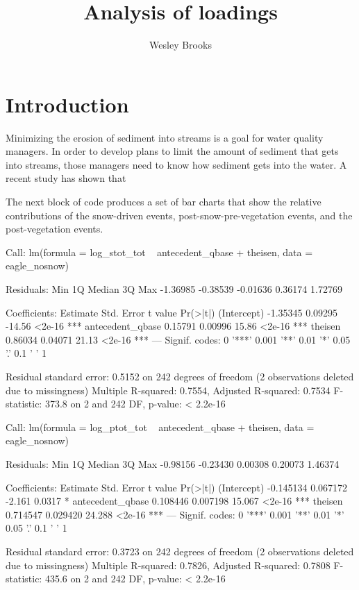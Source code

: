 \documentclass[12pt]{article}
\title{Analysis of loadings}
\author{Wesley Brooks}
\date{}                                           %
\begin{document}
\maketitle


\section{Introduction}
Minimizing the erosion of sediment into streams is a goal for water quality managers. In order to develop plans to limit the amount of sediment that gets into streams, those managers need to know how sediment gets into the water. A recent study \cite{Danz:2010} has shown that 

The next block of code produces a set of bar charts that show the relative contributions of the snow-driven events, post-snow-pre-vegetation events, and the post-vegetation events.\\



\begin{Schunk}
\begin{Soutput}
Call:
lm(formula = log_stot_tot ~ antecedent_qbase + theisen, data = eagle_nosnow)

Residuals:
     Min       1Q   Median       3Q      Max 
-1.36985 -0.38539 -0.01636  0.36174  1.72769 

Coefficients:
                 Estimate Std. Error t value Pr(>|t|)    
(Intercept)      -1.35345    0.09295  -14.56   <2e-16 ***
antecedent_qbase  0.15791    0.00996   15.86   <2e-16 ***
theisen           0.86034    0.04071   21.13   <2e-16 ***
---
Signif. codes:  0 '***' 0.001 '**' 0.01 '*' 0.05 '.' 0.1 ' ' 1 

Residual standard error: 0.5152 on 242 degrees of freedom
  (2 observations deleted due to missingness)
Multiple R-squared: 0.7554,	Adjusted R-squared: 0.7534 
F-statistic: 373.8 on 2 and 242 DF,  p-value: < 2.2e-16 
\end{Soutput}
\begin{Soutput}
Call:
lm(formula = log_ptot_tot ~ antecedent_qbase + theisen, data = eagle_nosnow)

Residuals:
     Min       1Q   Median       3Q      Max 
-0.98156 -0.23430  0.00308  0.20073  1.46374 

Coefficients:
                  Estimate Std. Error t value Pr(>|t|)    
(Intercept)      -0.145134   0.067172  -2.161   0.0317 *  
antecedent_qbase  0.108446   0.007198  15.067   <2e-16 ***
theisen           0.714547   0.029420  24.288   <2e-16 ***
---
Signif. codes:  0 '***' 0.001 '**' 0.01 '*' 0.05 '.' 0.1 ' ' 1 

Residual standard error: 0.3723 on 242 degrees of freedom
  (2 observations deleted due to missingness)
Multiple R-squared: 0.7826,	Adjusted R-squared: 0.7808 
F-statistic: 435.6 on 2 and 242 DF,  p-value: < 2.2e-16 
\end{Soutput}
\end{Schunk}
\end{document}
